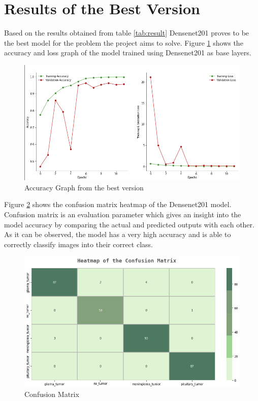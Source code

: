 \section{Results of the Best Version}
Based on the results obtained from table \ref{tab:result} Densenet201 proves to be the best model for the problem the project aims to solve. Figure \ref{fig:best_version} shows the accuracy and loss graph of the model trained using Densenet201 as base layers.
\begin{figure}[H]
\includegraphics[scale=0.6]{Photos/accuracy_loss.PNG}
\caption{Accuracy Graph from the best version} \label{fig:best_version}
\end{figure}
Figure \ref{fig:confusion} shows the confusion matrix heatmap of the Densenet201 model. Confusion matrix is an evaluation parameter which gives an insight into the model accuracy by comparing the actual and predicted outputs with each other. As it can be observed, the model has a very high accuracy and is able to correctly classify images into their correct class.
\begin{figure}[H]
\includegraphics[scale=0.6]{Photos/confusion_matrix.PNG}
\caption{Confusion Matrix} \label{fig:confusion}
\end{figure}
